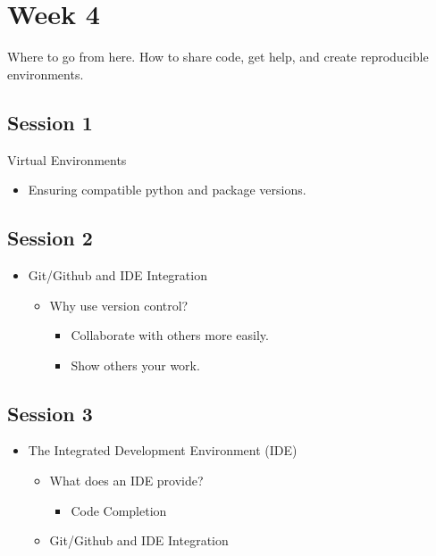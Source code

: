 \documentclass[11pt]{article}
\begin{document}
\section{Week 4}
\label{sec:org726adbd}

Where to go from here.  How to share code, get help, and create reproducible
environments.

\subsection{Session 1}
\label{sec:orge423071}

Virtual Environments
\begin{itemize}
\item Ensuring compatible python and package versions.
\end{itemize}

\subsection{Session 2}
\label{sec:org57ff0d6}

\begin{itemize}
\item Git/Github and IDE Integration
\begin{itemize}
\item Why use version control?
\begin{itemize}
\item Collaborate with others more easily.
\item Show others your work.
\end{itemize}
\end{itemize}
\end{itemize}

\subsection{Session 3}
\label{sec:org6f8e51f}

\begin{itemize}
\item The Integrated Development Environment (IDE)
\begin{itemize}
\item What does an IDE provide?
\begin{itemize}
\item Code Completion
\end{itemize}
\item Git/Github and IDE Integration
\end{itemize}
\end{itemize}
\end{document}
